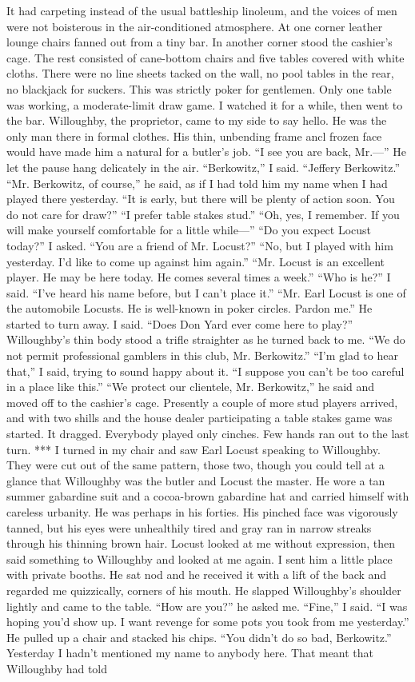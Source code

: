\documentclass{novel}
\begin{document}
It had carpeting instead of the usual battleship linoleum, and the voices of men were not boisterous in the air-conditioned atmosphere. At one corner leather lounge chairs fanned out from a tiny bar. In another corner stood the cashier’s cage. The rest consisted of cane-bottom chairs and five tables covered with white cloths. There were no line sheets tacked on the wall, no pool tables in the rear, no blackjack for suckers. This was strictly poker for gentlemen. Only one table was working, a moderate-limit draw game. I watched it for a while, then went to the bar. Willoughby, the proprietor, came to my side to say hello. He was the only man there in formal clothes. His thin, unbending frame ancl frozen face would have made him a natural for a butler’s job. “I see you are back, Mr.—” He let the pause hang delicately in the air. “Berkowitz,” I said. “Jeffery Berkowitz.” “Mr. Berkowitz, of course,” he said, as if I had told him my name when I had played there yesterday. “It is early, but there will be plenty of action soon. You do not care for draw?” “I prefer table stakes stud.” “Oh, yes, I remember. If you will make yourself comfortable for a little while—” “Do you expect Locust today?” I asked. “You are a friend of Mr. Locust?” “No, but I played with him yesterday. I’d like to come up against him again.” “Mr. Locust is an excellent player. He may be here today. He comes several times a week.” “Who is he?” I said. “I’ve heard his name before, but I can’t place it.” “Mr. Earl Locust is one of the automobile Locusts. He is well-known in poker circles. Pardon me.” He started to turn away. I said. “Does Don Yard ever come here to play?” Willoughby’s thin body stood a trifle straighter as he turned back to me. “We do not permit professional gamblers in this club, Mr. Berkowitz.” “I’m glad to hear that,” I said, trying to sound happy about it. “I suppose you can’t be too careful in a place like this.” “We protect our clientele, Mr. Berkowitz,” he said and moved off to the cashier’s cage. Presently a couple of more stud players arrived, and with two shills and the house dealer participating a table stakes game was started. It dragged. Everybody played only cinches. Few hands ran out to the last turn. *** I turned in my chair and saw Earl Locust speaking to Willoughby. They were cut out of the same pattern, those two, though you could tell at a glance that Willoughby was the butler and Locust the master. He wore a tan summer gabardine suit and a cocoa-brown gabardine hat and carried himself with careless urbanity. He was perhaps in his forties. His pinched face was vigorously tanned, but his eyes were unhealthily tired and gray ran in narrow streaks through his thinning brown hair. Locust looked at me without expression, then said something to Willoughby and looked at me again. I sent him a little place with private booths. He sat nod and he received it with a lift of the back and regarded me quizzically, corners of his mouth. He slapped Willoughby’s shoulder lightly and came to the table. “How are you?” he asked me. “Fine,” I said. “I was hoping you’d show up. I want revenge for some pots you took from me yesterday.” He pulled up a chair and stacked his chips. “You didn’t do so bad, Berkowitz.” Yesterday I hadn’t mentioned my name to anybody here. That meant that Willoughby had told 
\end{document}

